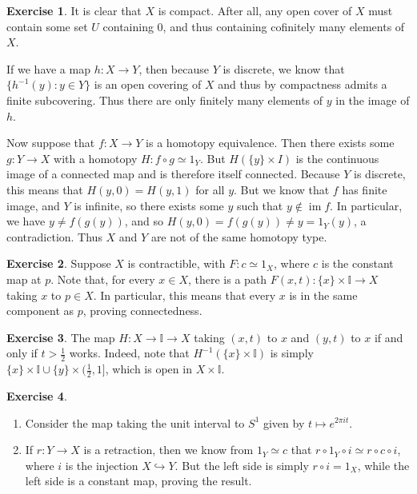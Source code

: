 \documentclass[10pt]{article}
\theoremstyle{definition}
\newtheorem{intex}{Exercise}[section]
\newenvironment{exercise}{\begin{intex}\label{\theintex}}{\end{intex}}
\newcommand*\II{\mathbb I}
\DeclareMathOperator\im{im}
\begin{document}
\begin{exercise} \leavevmode
It is clear that $X$ is compact. After all, any open cover of $X$ must contain some set $U$ containing 0, and thus containing cofinitely many elements of $X$. 

If we have a map $h:X\to Y$, then because $Y$ is discrete, we know that $\{h^{-1}(y):y\in Y\}$ is an open covering of $X$ and thus by compactness admits a finite subcovering. Thus there are only finitely many elements of $y$ in the image of $h$. 

Now suppose that $f:X\to Y$ is a homotopy equivalence. Then there exists some $g:Y\to X$ with a homotopy $H:f\circ g\simeq1_Y$. But $H(\{y\}\times I)$ is the continuous image of a connected map and is therefore itself connected. Because $Y$ is discrete, this means that $H(y,0)=H(y,1)$ for all $y$. But we know that $f$ has finite image, and $Y$ is infinite, so there exists some $y$ such that $y\not\in\im f$. In particular, we have $y\ne f(g(y))$, and so $H(y,0)=f(g(y))\ne y=1_Y(y)$, a contradiction. Thus $X$ and $Y$ are not of the same homotopy type. 
\end{exercise} 

\begin{exercise} \leavevmode
Suppose $X$ is contractible, with $F:c\simeq1_X$, where $c$ is the constant map at $p$. Note that, for every $x\in X$, there is a path $F(x,t):\{x\}\times\II\to X$ taking $x$ to $p\in X$. In particular, this means that every $x$ is in the same component as $p$, proving connectedness. 
\end{exercise} 

\begin{exercise} \leavevmode
The map $H:X\to\II\to X$ taking $(x,t)$ to $x$ and $(y,t)$ to $x$ if and only if $t>\frac12$ works. Indeed, note that $H^{-1}(\{x\}\times\II)$ is simply $\{x\}\times\II\cup\{y\}\times(\frac12,1]$, which is open in $X\times\II$. 
\end{exercise} 

\begin{exercise} \leavevmode
\begin{enumerate}
\item Consider the map taking the unit interval to $S^1$ given by $t\mapsto e^{2\pi it}$. 

\item If $r:Y\to X$ is a retraction, then we know from $1_Y\simeq c$ that $r\circ1_Y\circ i\simeq r\circ c\circ i$, where $i$ is the injection $X\hookrightarrow Y$. But the left side is simply $r\circ i=1_X$, while the left side is a constant map, proving the result. 
\end{enumerate} 
\end{exercise} 
\end{document}
